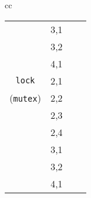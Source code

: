 \begin{table}[t]
\begin{center}
\begin{tabular}{cc}
\begin{tabular}{cc||r|r}
			& 3,1 & \cpu{21.68} & \ints{186} \\ %
			& 3,2 & \ETAdag{8y 153d} & \ETAdag{1590416} \\ %
			& 4,1 & \cpu{30408.58} & \ints {282084} \\ %
			\hline
			{\tt lock}
			& 2,1 & \cpu{2.49} & \ints{4}		\\ %
			({\tt mutex})
			& 2,2 & \cpu{12.72} & \ints{180}	\\ %
			& 2,3 & \cpu{273.45} & \ints{8356}	\\ %
			& 2,4 & \cpu{13545.35} & \ints{384512}	\\ %
			& 3,1 & \cpu{11.21} & \ints{132}	\\ %
			& 3,2 & \cpu{25434.85} & \ints{718690}	\\ %
			& 4,1 & \cpu{493.38} & \ints{15064}	\\ %

\end{tabular}
\end{tabular}
\end{center}
\end{table}
